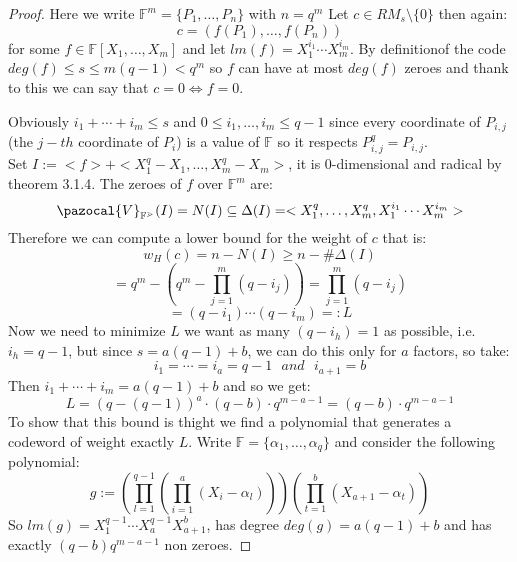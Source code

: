 \documentclass[11pt,a4paper]{report}
\theoremstyle{plain}
\theoremstyle{definition}
\newcommand{\V}{\pazocal{V}}
\begin{document}
\begin{thm-hand}[5.2.1]
\end{thm-hand}
\begin{proof}
	Here we write $\mathbb{F}^m = \{P_1,\ldots, P_n\}$ with $n = q^m$
	Let $c \in RM_s \setminus\{0\}$ then again:
		\[
			c = (f(P_1),\ldots, f(P_n))	
		\]
		for some $f \in \mathbb{F}[X_1,\ldots,X_m]$ and let $lm(f) = X_1^{i_1}\cdots X_m^{i_m}$. By definitionof the code $deg(f) \le s \le m(q-1) < q^m$ so $f$ can have at most $deg(f)$ zeroes and thank to this we can say that $c=0 \iff f = 0$.
		
		Obviously $i_1 + \cdots + i_m \le s$ and $0 \le i_1, \ldots, i_m \le q-1$ since every coordinate of $P_{i,j}$ (the $j-th$ coordinate of $P_i$) is a value of $\mathbb{F}$ so it respects $P_{i,j}^q = P_{i,j}$.\\
		Set $I := <f> + <X_1^q - X_1,\ldots,X_m^q - X_m>$, it is 0-dimensional and radical by theorem 3.1.4. The zeroes of $f$ over $\mathbb{F}^m$ are:
		\[
			\V_{\mathbb{F^m}}(I) = N(I) \subseteq \Delta(I) = <X_1^q,\ldots,X_m^q ,X_1^{i_1}\cdots X_m^{i_m}>		
		\]
		Therefore we can compute a lower bound for the weight of $c$ that is:
		\[
			w_H(c) = n - N(I) \ge n - \#\Delta(I) 		
		\]
		\[
			= q^m - (q^m - \prod\limits_{j=1}^m(q-i_j)) = \prod\limits_{j=1}^m(q-i_j)		
		\]
		\[
			 = (q-i_1)\cdots(q - i_m) =: L
		\]
		Now we need to minimize $L$ we want as many $(q - i_h) = 1$ as possible, i.e. $i_h = q-1$, but since $s = a(q-1) + b$, we can do this only for $a$ factors, so take:
			\[	
				i_1 = \cdots = i_a = q-1\ \ \ and\ \ \ i_{a+1} = b			
			\]
			Then $i_1 + \cdots + i_m = a(q-1) + b$ and so we get:
			\[
				L = (q - (q-1))^a\cdot (q-b) \cdot q^{m - a - 1} = (q-b) \cdot q^{m - a - 1}
			\]
		To show that this bound is thight we find a polynomial that generates a codeword of weight exactly $L$. Write $\mathbb{F} = \{\alpha_1,\ldots,\alpha_q\}$ and consider the following polynomial:
		\[
			g := (\prod\limits_{l=1}^{q-1}(\prod\limits_{i=1}^a(X_i - \alpha_l)))(\prod\limits_{t =1}^{b}(X_{a+1} - \alpha_t))		
		\]
		So $lm(g) = X_1^{q-1}\cdots X_a^{q-1}X_{a+1}^b$, has degree $deg(g) = a(q-1) + b$ and has exactly $(q-b)q^{m-a-1}$ non zeroes.
\end{proof}
\end{document}
